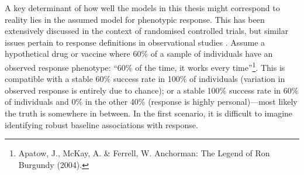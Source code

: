 A key determinant of how well the models in this thesis might correspond to reality lies in the assumed model for phenotypic response.
This has been extensively discussed in the context of randomised controlled trials, but similar issues pertain to response definitions in observational studies \autocite{senn2018StatisticalPitfallsPersonalized}.
Assume a hypothetical drug or vaccine where 60\% of a sample of individuals have an observed response phenotype: \enquote{60\% of the time, it works every time}\footnote{Apatow, J., McKay, A. \& Ferrell, W. Anchorman: The Legend of Ron Burgundy (2004).}.
This is compatible with a stable 60\% success rate in 100\% of individuals (variation in observed response is entirely due to chance);
or a stable 100\% success rate in 60\% of individuals and 0\% in the other 40\% (response is highly personal)---most likely the truth is somewhere in between.
In the first scenario, it is difficult to imagine identifying robust baseline associations with response.

